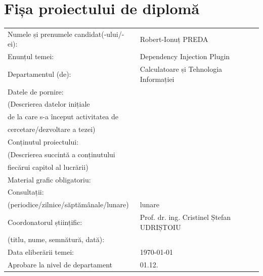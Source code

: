 \chapter*{Fișa proiectului de diplomă}
\begin{tabular}{ l l }
	Numele și prenumele candidat(-ului/-ei):\vspace{10pt} & Robert-Ionuț PREDA \\
	
	Enunțul temei:\vspace{10pt} &  Dependency Injection Plugin \\
	
	Departamentul (de):\vspace{10pt} &  Calculatoare și Tehnologia Informației\\
	
	Datele de pornire: & \\
	(Descrierea datelor inițiale & \\
	de la care s-a început activitatea de & \\ cercetare/dezvoltare a tezei)\vspace{10pt} & \\
	
	Conținutul proiectului: & \\
	(Descrierea succintă a conținutului & \\ fiecărui capitol al lucrării)\vspace{10pt} & \\
	
	Material grafic obligatoriu:\vspace{10pt} &  \\

	Consultații: & \\
	(periodice/zilnice/săptămânale/lunare)\vspace{10pt} & lunare\\
	
	Coordonatorul științific: &	Prof. dr. ing. Cristinel Ștefan UDRIȘTOIU \\
	(titlu, nume, semnătură, dată):\vspace{10pt} &	\\

	
	Data eliberării temei:\vspace{10pt} & \today \\
	
	Aprobare la nivel de departament\vspace{10pt} & 01.12.\number\numexpr\year-1\relax \\
	

\end{tabular}
